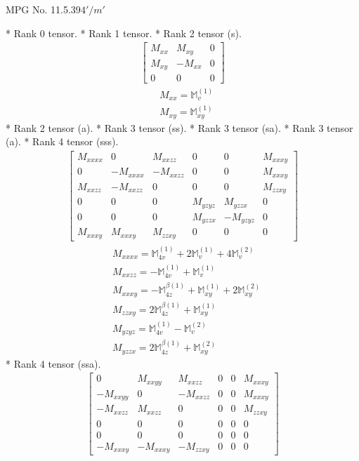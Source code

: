 \documentclass[fleqn,8pt,landscape]{jsarticle}
\begin{document}
\setcounter{MaxMatrixCols}{32}

\renewcommand{\tablename}{Table~}
\renewcommand{\figurename}{Figure~}
\begin{center}
\LARGE
MPG No. 11.5.39\quad$4'/m'$
\end{center}
* Rank 0 tensor.
* Rank 1 tensor.
* Rank 2 tensor (s).
\begin{align*}
\begin{bmatrix} M_{xx} & M_{xy} & 0 \\ M_{xy} & - M_{xx} & 0 \\ 0 & 0 & 0 \end{bmatrix}
\end{align*}
\begin{align*}
& M_{xx} = \mathbb{M}_{v}^{(1)} \\
& M_{xy} = \mathbb{M}_{xy}^{(1)}
\end{align*}
* Rank 2 tensor (a).
* Rank 3 tensor (ss).
* Rank 3 tensor (sa).
* Rank 3 tensor (a).
* Rank 4 tensor (sss).
\begin{align*}
\begin{bmatrix} M_{xxxx} & 0 & M_{xxzz} & 0 & 0 & M_{xxxy} \\ 0 & - M_{xxxx} & - M_{xxzz} & 0 & 0 & M_{xxxy} \\ M_{xxzz} & - M_{xxzz} & 0 & 0 & 0 & M_{zzxy} \\ 0 & 0 & 0 & M_{yzyz} & M_{yzzx} & 0 \\ 0 & 0 & 0 & M_{yzzx} & - M_{yzyz} & 0 \\ M_{xxxy} & M_{xxxy} & M_{zzxy} & 0 & 0 & 0 \end{bmatrix}
\end{align*}
\begin{align*}
& M_{xxxx} = \mathbb{M}_{4v}^{(1)} + 2 \mathbb{M}_{v}^{(1)} + 4 \mathbb{M}_{v}^{(2)} \\
& M_{xxzz} = - \mathbb{M}_{4v}^{(1)} + \mathbb{M}_{v}^{(1)} \\
& M_{xxxy} = - \mathbb{M}_{4z}^{\beta(1)} + \mathbb{M}_{xy}^{(1)} + 2 \mathbb{M}_{xy}^{(2)} \\
& M_{zzxy} = 2 \mathbb{M}_{4z}^{\beta(1)} + \mathbb{M}_{xy}^{(1)} \\
& M_{yzyz} = \mathbb{M}_{4v}^{(1)} - \mathbb{M}_{v}^{(2)} \\
& M_{yzzx} = 2 \mathbb{M}_{4z}^{\beta(1)} + \mathbb{M}_{xy}^{(2)}
\end{align*}
* Rank 4 tensor (ssa).
\begin{align*}
\begin{bmatrix} 0 & M_{xxyy} & M_{xxzz} & 0 & 0 & M_{xxxy} \\ - M_{xxyy} & 0 & - M_{xxzz} & 0 & 0 & M_{xxxy} \\ - M_{xxzz} & M_{xxzz} & 0 & 0 & 0 & M_{zzxy} \\ 0 & 0 & 0 & 0 & 0 & 0 \\ 0 & 0 & 0 & 0 & 0 & 0 \\ - M_{xxxy} & - M_{xxxy} & - M_{zzxy} & 0 & 0 & 0 \end{bmatrix}
\end{align*}
\end{document}
